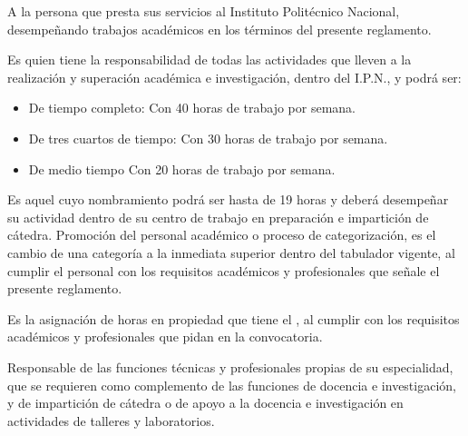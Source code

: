 \begin{bGlosario}
	
	
	 A la persona que presta sus servicios al Instituto Politécnico Nacional, desempeñando trabajos académicos en los términos del presente reglamento.
	
	 Es quien tiene la responsabilidad de todas las actividades que lleven a la realización y superación
	académica e investigación, dentro del I.P.N., y podrá ser:
		\begin{itemize}
			\item De tiempo completo: Con 40 horas de trabajo por semana.
			\item De tres cuartos de tiempo: Con 30 horas de trabajo por semana.
			\item De medio tiempo Con 20 horas de trabajo por semana.
		\end{itemize}
	
	 Es aquel cuyo nombramiento podrá ser hasta de 19 horas y deberá desempeñar su actividad dentro de su centro de trabajo en preparación e impartición de cátedra.
	 Promoción del personal académico o proceso de categorización, es el cambio de una categoría a la inmediata superior dentro del tabulador vigente, al cumplir el personal con los requisitos académicos y profesionales que señale el presente reglamento.
	
	 Es la asignación de horas en propiedad que tiene el , al cumplir con los requisitos académicos y profesionales que pidan en la convocatoria.
	
	 Responsable de las funciones técnicas y profesionales propias de su especialidad, que se requieren como complemento de las funciones de docencia e investigación, y de impartición de cátedra o de apoyo a la docencia e investigación en actividades de talleres y laboratorios.
		

\end{bGlosario}
